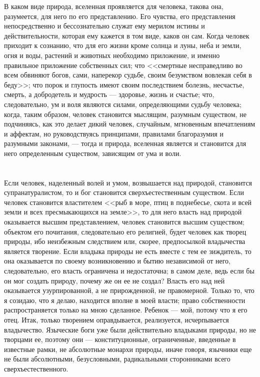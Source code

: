 \documentclass[12pt,oneside]{book}
\begin{document}
В каком виде природа, вселенная проявляется для человека, такова она, разумеется, для него по его представлению. Его чувства, его представления непосредственно и бессознательно служат ему мерилом истины и действительности, которая ему кажется в том виде, каков он сам. Когда человек приходит к сознанию, что для его жизни кроме солнца и луны, неба и земли, огня и воды, растений и животных необходимо приложение, и именно правильное приложение собственных сил; что <<смертные несправедливо во всем обвиняют богов, сами, наперекор судьбе, своим безумством вовлекая себя в беду>>; что порок и глупость имеют своим последствием болезнь, несчастье, смерть, а добродетель и мудрость --- здоровье, жизнь и счастье; что, следовательно, ум и воля являются силами, определяющими судьбу человека; когда, таким образом, человек становится мыслящим, разумным существом, не подчиняясь, как это делает дикий человек, случайным, мгновенным впечатлениям и аффектам, но руководствуясь принципами, правилами благоразумия и разумными законами, --- тогда и природа, вселенная является и становится для него определенным существом, зависящим от ума и воли.



\chapter{}

Если человек, наделенный волей и умом, возвышается над природой, становится супранатуралистом, то и бог становится сверхъестественным существом. Если человек становится властителем <<рыб в море, птиц в поднебесье, скота и всей земли и всех пресмыкающихся на земле>>, то для него власть над природой оказывается высшим представлением, человек становится высшим существом; объектом его почитания, следовательно его религией, будет человек как творец природы, ибо неизбежным следствием или, скорее, предпосылкой владычества является творение. Если владыка природы не есть вместе с тем ее зиждитель, то она оказывается по своему возникновению и бытию независимой от него, следовательно, его власть ограничена и недостаточна; в самом деле, ведь если бы он мог создать природу, почему же он ее не создал? Власть его над ней оказывается узурпированной, а не прирожденной, не правомерной. Только то, что я созидаю, что я делаю, находится вполне в моей власти; право собственности распространяется только на мною сделанное. Ребенок --- мой, потому что я его отец. Итак, только творением оправдывается, реализуется, исчерпывается владычество. Языческие боги уже были действительно владыками природы, но не творцами ее, поэтому они --- конституционные, ограниченные, введенные в известные рамки, не абсолютные монархи природы, иначе говоря, язычники еще не были абсолютными, безусловными, радикальными сторонниками всего сверхъестественного.
\end{document}
